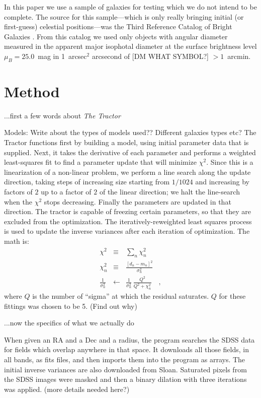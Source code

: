 \documentclass[12pt,preprint,pdftex]{aastex}
\newcommand{\project}[1]{\textsl{#1}}
\begin{document}
In this paper we use a sample of galaxies for testing which we do not
intend to be complete.  The source for this sample---which is only
really bringing initial (or first-guess) celestial positions---was the
Third Reference Catalog of Bright Galaxies \citep{rc3}.  From this
catalog we used only objects with angular diameter measured in the
apparent major isophotal diameter at the surface brightness level
$\mu_B = 25.0$~mag in 1~arcsec$^2$ arcsecond of [DM WHAT SYMBOL?]
$>1$~arcmin.

\section{Method}\label{sec:method}

...first a few words about \project{The Tractor}

Models: Write about the types of models used?? Different galaxies types etc?
The Tractor functions first by building a model, using initial parameter data that is supplied. Next, it takes the derivative of each parameter and performs a weighted least-squares fit to find a parameter update that will minimize $\chi^2$.  Since this is a linearization of a non-linear problem, we perform a line search along the update direction, taking steps of increasing size starting from $1/1024$ and increasing by factors of $2$ up to a factor of $2$ of the linear direction; we halt the line-search when the $\chi^2$ stops decreasing.  Finally the parameters are updated in that direction. The tractor is capable of freezing certain parameters, so that they are excluded from the optimization. 
The iteratively-reweighted least squares process is used to update the
inverse variances after each iteration of optimization. The math is:
\begin{eqnarray}
\chi^2 &\equiv& \sum_n \chi_n^2
\\
\chi_n^2 &\equiv& \frac{[d_n - m_n]^2}{\sigma_n^2}
\\
\frac{1}{\sigma_n^2} &\leftarrow& \frac{1}{\sigma_n^2}\,\frac{Q^2}{Q^2+\chi_n^2}
\quad ,
\end{eqnarray}
where $Q$ is the number of ``sigma'' at which the residual saturates. $Q$ for these fittings was chosen to be 5. (Find out why)

...now the specifics of what we actually do

When given an RA and a Dec and a radius, the program searches the SDSS data for fields which overlap anywhere in that space. It downloads all those fields, in all bands, as fits files, and then imports them into the program as arrays. The initial inverse variances are also downloaded from Sloan.
Saturated pixels from the SDSS images were masked and then a binary dilation with three iterations was applied. (more details needed here?)
\end{document}
